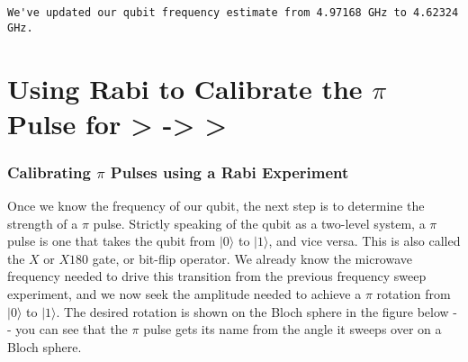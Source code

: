 \begin{verbatim}
We've updated our qubit frequency estimate from 4.97168 GHz to 4.62324 GHz.
\end{verbatim}

\hypertarget{6e765aa4-4d58-4e8b-a3a3-0cc03a02d309}{}
\hypertarget{using-rabi-to-calibrate-the-pi-pulse-for-1---2-}{%
\section{\texorpdfstring{Using Rabi to Calibrate the \(\pi\) Pulse for
\textgreater{} -\textgreater{} \textgreater{}
}{Using Rabi to Calibrate the \textbackslash pi Pulse for \textgreater{} -\textgreater{} \textgreater{} }}\label{using-rabi-to-calibrate-the-pi-pulse-for-1---2-}}

\hypertarget{calibrating-pi-pulses-using-a-rabi-experiment-}{%
\subsubsection{\texorpdfstring{Calibrating \(\pi\) Pulses using a Rabi
Experiment
}{Calibrating \textbackslash pi Pulses using a Rabi Experiment }}\label{calibrating-pi-pulses-using-a-rabi-experiment-}}

Once we know the frequency of our qubit, the next step is to determine
the strength of a \(\pi\) pulse. Strictly speaking of the qubit as a
two-level system, a \(\pi\) pulse is one that takes the qubit from
\(\vert0\rangle\) to \(\vert1\rangle\), and vice versa. This is also
called the \(X\) or \(X180\) gate, or bit-flip operator. We already know
the microwave frequency needed to drive this transition from the
previous frequency sweep experiment, and we now seek the amplitude
needed to achieve a \(\pi\) rotation from \(\vert0\rangle\) to
\(\vert1\rangle\). The desired rotation is shown on the Bloch sphere in
the figure below -\/- you can see that the \(\pi\) pulse gets its name
from the angle it sweeps over on a Bloch sphere.


